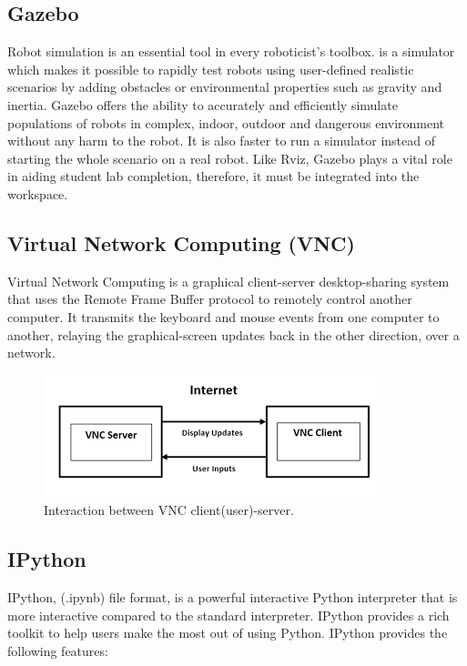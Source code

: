 \documentclass{l4proj}
\begin{document}
\subsection {Gazebo}

Robot simulation is an essential tool in every roboticist's toolbox. \cite{Gazebo} is a simulator which makes it possible to rapidly test robots using user-defined realistic scenarios by adding obstacles or environmental properties such as gravity and inertia. Gazebo offers the ability to accurately and efficiently simulate populations of robots in complex, indoor, outdoor and dangerous environment without any harm to the robot. It is also faster to run a simulator instead of starting the whole scenario on a real robot. Like Rviz, Gazebo plays a vital role in aiding student lab completion, therefore, it must be integrated into the workspace.

\subsection{Virtual Network Computing (VNC)}
Virtual Network Computing is a graphical client-server desktop-sharing system that uses the Remote Frame Buffer protocol to remotely control another computer. It transmits the keyboard and mouse events from one computer to another, relaying the graphical-screen updates back in the other direction, over a network.

\begin{figure}[h]
    \centering
    \includegraphics{images/vnc_image.png}
    \caption{Interaction between VNC client(user)-server.}
    \label{fig:vnc_diagram}
\end{figure}

\subsection{IPython}

IPython, (.ipynb) file format, is a powerful interactive Python interpreter that is more interactive compared to the standard interpreter. IPython provides a rich toolkit to help users make the most out of using Python. IPython provides the following features:
\end{document}
